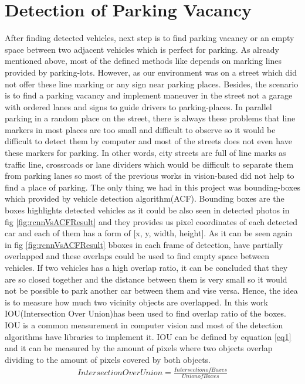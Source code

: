 \section{Detection of Parking Vacancy}
After finding detected vehicles, next step is to find parking vacancy or an empty space between two adjacent vehicles which is perfect for parking. As already mentioned above, most of the defined methods like \cite{markingPointConf} depends on marking lines provided by parking-lots. However, as our environment was on a street which did not offer these line marking or any sign near parking places. Besides, the scenario is to find a parking vacancy and implement maneuver in the street not a garage with ordered lanes and signs to guide drivers to parking-places. In parallel parking in a random place on the street, there is always these problems that line markers in most places are too small and difficult to observe so it would be difficult to detect them by computer and most of the streets does not even have these markers for parking. In other words, city streets are full of line marks as traffic line, crossroads or lane dividers which would be difficult to separate them from parking lanes so most of the previous works in vision-based did not help to find a place of parking. The only thing we had in this project was bounding-boxes which provided by vehicle detection algorithm(ACF). Bounding boxes are the boxes highlights detected vehicles as it could be also seen in detected photos in fig \ref{fig:rcnnVsACFResult} and they provides us pixel coordinates of each detected car and each of them has a form of [x, y, width, height]. As it can be seen again in fig \ref{fig:rcnnVsACFResult} bboxes in each frame of detection, have partially overlapped and these overlaps could be used to find empty space between vehicles. If two vehicles has a high overlap ratio, it can be concluded that they are so closed together and the distance between them is very small so it would not be possible to park another car between them and vise versa. Hence, the idea is to measure how much two vicinity objects are overlapped. In this work IOU(Intersection Over Union)has been used to find overlap ratio of the boxes. IOU is a common measurement in computer vision and most of the detection algorithms have libraries to implement it. IOU can be defined by equation \ref{eq1} and it can be measured by the amount of pixels where two objects overlap dividing to the amount of pixels covered by both objects.
\begin{equation} \label{eq1}
\begin{split}
Intersection Over Union = \frac{Intersection of Boxes}{Union of Boxes}
\end{split}
\end{equation}
